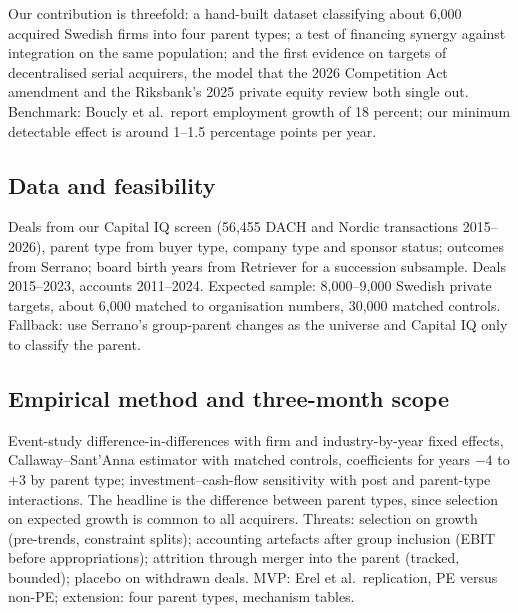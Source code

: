 \documentclass[12pt,a4paper]{article}
\begin{document}
Our contribution is threefold: a hand-built dataset classifying about 6,000 acquired Swedish firms into four parent types; a test of financing synergy against integration on the same population; and the first evidence on targets of decentralised serial acquirers, the model that the 2026 Competition Act amendment and the Riksbank's 2025 private equity review both single out. Benchmark: Boucly et al.\ report employment growth of 18 percent; our minimum detectable effect is around 1--1.5 percentage points per year.

\subsection{Data and feasibility}

Deals from our Capital IQ screen (56,455 DACH and Nordic transactions 2015--2026), parent type from buyer type, company type and sponsor status; outcomes from Serrano; board birth years from Retriever for a succession subsample. Deals 2015--2023, accounts 2011--2024. Expected sample: 8,000--9,000 Swedish private targets, about 6,000 matched to organisation numbers, 30,000 matched controls. Fallback: use Serrano's group-parent changes as the universe and Capital IQ only to classify the parent.

\subsection{Empirical method and three-month scope}

Event-study difference-in-differences with firm and industry-by-year fixed effects, Callaway--Sant'Anna estimator with matched controls, coefficients for years $-4$ to $+3$ by parent type; investment--cash-flow sensitivity with post and parent-type interactions. The headline is the difference between parent types, since selection on expected growth is common to all acquirers. Threats: selection on growth (pre-trends, constraint splits); accounting artefacts after group inclusion (EBIT before appropriations); attrition through merger into the parent (tracked, bounded); placebo on withdrawn deals. MVP: Erel et al.\ replication, PE versus non-PE; extension: four parent types, mechanism tables.
\end{document}
